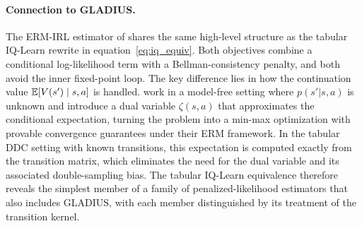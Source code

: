 \paragraph{Connection to GLADIUS.}
The ERM-IRL estimator of \citet{kang2025} shares the same high-level structure as the tabular IQ-Learn rewrite in equation~\eqref{eq:iq_equiv}. Both objectives combine a conditional log-likelihood term with a Bellman-consistency penalty, and both avoid the inner fixed-point loop. The key difference lies in how the continuation value $\mathbb{E}[V(s') \mid s, a]$ is handled. \citet{kang2025} work in a model-free setting where $p(s'|s,a)$ is unknown and introduce a dual variable $\zeta(s,a)$ that approximates the conditional expectation, turning the problem into a min-max optimization with provable convergence guarantees under their ERM framework. In the tabular DDC setting with known transitions, this expectation is computed exactly from the transition matrix, which eliminates the need for the dual variable and its associated double-sampling bias. The tabular IQ-Learn equivalence therefore reveals the simplest member of a family of penalized-likelihood estimators that also includes GLADIUS, with each member distinguished by its treatment of the transition kernel.
